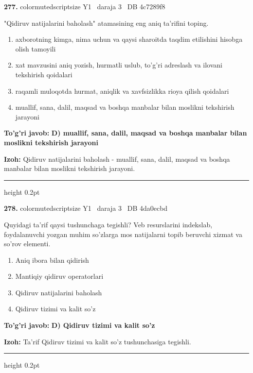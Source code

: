 \documentclass[10pt,a4paper,oneside]{article}
\begin{document}
\noindent\textbf{\color{ink}277.}  {color{muted}scriptsize Y1 \textbullet\ daraja 3 \textbullet\ DB 4c7289f8}
\par
"Qidiruv natijalarini baholash" atamasining eng aniq ta'rifini toping.
\begin{enumerate}[label=\Alph*),leftmargin=9mm]
\item axborotning kimga, nima uchun va qaysi sharoitda taqdim etilishini hisobga olish tamoyili
\item xat mavzusini aniq yozish, hurmatli uslub, to'g'ri adreslash va ilovani tekshirish qoidalari
\item raqamli muloqotda hurmat, aniqlik va xavfsizlikka rioya qilish qoidalari
\item muallif, sana, dalil, maqsad va boshqa manbalar bilan moslikni tekshirish jarayoni
\end{enumerate}
\begin{tcolorbox}[enhanced,breakable,colback=teal!4,colframe=teal!50!black,boxrule=0.5pt,arc=1.1mm,left=3mm,right=3mm,top=1.7mm,bottom=1.7mm,before skip=2mm,after skip=2mm]
\textbf{\color{teal}To'g'ri javob:} \textbf{D) muallif, sana, dalil, maqsad va boshqa manbalar bilan moslikni tekshirish jarayoni}
\par\smallskip
\textbf{Izoh:} Qidiruv natijalarini baholash - muallif, sana, dalil, maqsad va boshqa manbalar bilan moslikni tekshirish jarayoni.
\end{tcolorbox}
\vspace{2mm}\hrule height 0.2pt \vspace{3mm}

\noindent\textbf{\color{ink}278.}  {color{muted}scriptsize Y1 \textbullet\ daraja 3 \textbullet\ DB 4da0ecbd}
\par
Quyidagi ta'rif qaysi tushunchaga tegishli? Veb resurslarini indekslab, foydalanuvchi yozgan muhim so'zlarga mos natijalarni topib beruvchi xizmat va so'rov elementi.
\begin{enumerate}[label=\Alph*),leftmargin=9mm]
\item Aniq ibora bilan qidirish
\item Mantiqiy qidiruv operatorlari
\item Qidiruv natijalarini baholash
\item Qidiruv tizimi va kalit so'z
\end{enumerate}
\begin{tcolorbox}[enhanced,breakable,colback=teal!4,colframe=teal!50!black,boxrule=0.5pt,arc=1.1mm,left=3mm,right=3mm,top=1.7mm,bottom=1.7mm,before skip=2mm,after skip=2mm]
\textbf{\color{teal}To'g'ri javob:} \textbf{D) Qidiruv tizimi va kalit so'z}
\par\smallskip
\textbf{Izoh:} Ta'rif Qidiruv tizimi va kalit so'z tushunchasiga tegishli.
\end{tcolorbox}
\vspace{2mm}\hrule height 0.2pt \vspace{3mm}
\end{document}
